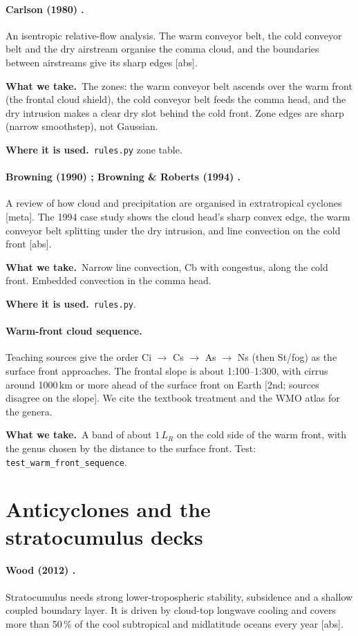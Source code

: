 \documentclass[11pt,a4paper]{article}
\newcommand{\verif}[1]{\textsf{\small[#1]}}
\newcommand{\takes}{\par\noindent\textbf{What we take.}\ }
\newcommand{\used}{\par\noindent\textbf{Where it is used.}\ }
\begin{document}
\paragraph{Carlson (1980) \cite{carlson1980}.}
An isentropic relative-flow analysis. The warm conveyor belt, the cold conveyor belt and the
dry airstream organise the comma cloud, and the boundaries between airstreams give its sharp
edges \verif{abs}.
\takes The zones: the warm conveyor belt ascends over the warm front (the frontal cloud
shield), the cold conveyor belt feeds the comma head, and the dry intrusion makes a clear
dry slot behind the cold front. Zone edges are sharp (narrow smoothstep), not Gaussian.
\used \texttt{rules.py} zone table.

\paragraph{Browning (1990) \cite{browning1990}; Browning \& Roberts (1994) \cite{browning1994}.}
A review of how cloud and precipitation are organised in extratropical cyclones
\verif{meta}. The 1994 case study shows the cloud head's sharp convex edge, the warm conveyor
belt splitting under the dry intrusion, and line convection on the cold front \verif{abs}.
\takes Narrow line convection, Cb with congestus, along the cold front. Embedded
convection in the comma head.
\used \texttt{rules.py}.

\paragraph{Warm-front cloud sequence.}
Teaching sources give the order Ci $\to$ Cs $\to$ As $\to$ Ns (then St/fog) as the surface
front approaches. The frontal slope is about 1:100--1:300, with cirrus around 1000\,km or
more ahead of the surface front on Earth \verif{2nd; sources disagree on the slope}. We cite
the textbook treatment \cite{holton2013} and the WMO atlas \cite{wmo2017} for the genera.
\takes A band of about $1\,L_R$ on the cold side of the warm front, with the genus chosen by
the distance to the surface front. Test: \texttt{test\_warm\_front\_sequence}.

\section{Anticyclones and the stratocumulus decks}

\paragraph{Wood (2012) \cite{wood2012}.}
Stratocumulus needs strong lower-tropospheric stability, subsidence and a shallow coupled
boundary layer. It is driven by cloud-top longwave cooling and covers more than 50\,\% of
the cool subtropical and midlatitude oceans every year \verif{abs}.
\end{document}
